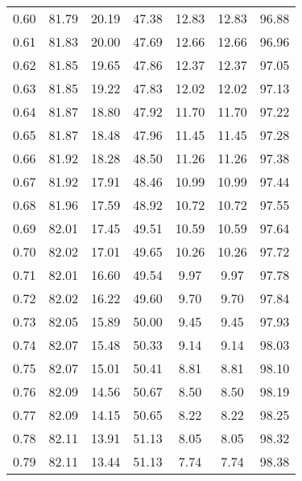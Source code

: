 \begin{tabular}{|c|c|c|c|c|c|c|}
      0.60 &     81.79 &     20.19 &      47.38 &   12.83 &      12.83 &         96.88 \\
      0.61 &     81.83 &     20.00 &      47.69 &   12.66 &      12.66 &         96.96 \\
      0.62 &     81.85 &     19.65 &      47.86 &   12.37 &      12.37 &         97.05 \\
      0.63 &     81.85 &     19.22 &      47.83 &   12.02 &      12.02 &         97.13 \\
      0.64 &     81.87 &     18.80 &      47.92 &   11.70 &      11.70 &         97.22 \\
      0.65 &     81.87 &     18.48 &      47.96 &   11.45 &      11.45 &         97.28 \\
      0.66 &     81.92 &     18.28 &      48.50 &   11.26 &      11.26 &         97.38 \\
      0.67 &     81.92 &     17.91 &      48.46 &   10.99 &      10.99 &         97.44 \\
      0.68 &     81.96 &     17.59 &      48.92 &   10.72 &      10.72 &         97.55 \\
      0.69 &     82.01 &     17.45 &      49.51 &   10.59 &      10.59 &         97.64 \\
      0.70 &     82.02 &     17.01 &      49.65 &   10.26 &      10.26 &         97.72 \\
      0.71 &     82.01 &     16.60 &      49.54 &    9.97 &       9.97 &         97.78 \\
      0.72 &     82.02 &     16.22 &      49.60 &    9.70 &       9.70 &         97.84 \\
      0.73 &     82.05 &     15.89 &      50.00 &    9.45 &       9.45 &         97.93 \\
      0.74 &     82.07 &     15.48 &      50.33 &    9.14 &       9.14 &         98.03 \\
      0.75 &     82.07 &     15.01 &      50.41 &    8.81 &       8.81 &         98.10 \\
      0.76 &     82.09 &     14.56 &      50.67 &    8.50 &       8.50 &         98.19 \\
      0.77 &     82.09 &     14.15 &      50.65 &    8.22 &       8.22 &         98.25 \\
      0.78 &     82.11 &     13.91 &      51.13 &    8.05 &       8.05 &         98.32 \\
      0.79 &     82.11 &     13.44 &      51.13 &    7.74 &       7.74 &         98.38 \\

\end{tabular}
